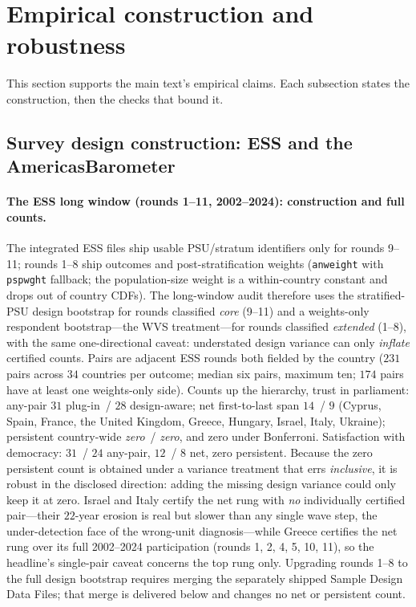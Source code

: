 \documentclass[12pt]{article}
\theoremstyle{definition}
\theoremstyle{remark}
\begin{document}
\section{Empirical construction and robustness}\label{sup:empirical}

This section supports the main text's empirical claims. Each subsection
states the construction, then the checks that bound it.

\subsection{Survey design construction: ESS and the AmericasBarometer}\label{sup:design}

\paragraph{The ESS long window (rounds 1--11, 2002--2024): construction and full
counts.} The integrated ESS files ship usable PSU/stratum identifiers only for
rounds 9--11; rounds 1--8 ship outcomes and post-stratification weights
(\texttt{anweight} with \texttt{pspwght} fallback; the population-size weight is a
within-country constant and drops out of country CDFs). The long-window audit therefore uses the
stratified-PSU design bootstrap for rounds classified \emph{core} (9--11) and a
weights-only respondent bootstrap---the WVS treatment---for rounds classified
\emph{extended} (1--8), with the same one-directional caveat: understated design
variance can only \emph{inflate} certified counts. Pairs are adjacent ESS rounds
both fielded by the country ($231$ pairs across $34$ countries per outcome; median
six pairs, maximum ten; $174$ pairs have at least one weights-only side). Counts up
the hierarchy, trust in parliament: any-pair $31$ plug-in~/ $28$ design-aware; net
first-to-last span $14$~/ $9$ (Cyprus, Spain, France, the United Kingdom, Greece,
Hungary, Israel, Italy, Ukraine); persistent country-wide \emph{zero}~/
\emph{zero}, and zero under Bonferroni. Satisfaction with democracy: $31$~/ $24$
any-pair, $12$~/ $8$ net, zero persistent. Because the zero persistent count is
obtained under a variance treatment that errs \emph{inclusive}, it is robust in
the disclosed direction: adding the missing design variance could only keep it at
zero. Israel and Italy certify the net rung with \emph{no} individually certified
pair---their $22$-year erosion is real but slower than any single wave step, the
under-detection face of the wrong-unit diagnosis---while Greece certifies the net
rung over its full 2002--2024 participation (rounds 1, 2, 4, 5, 10, 11), so the
headline's single-pair caveat concerns the top rung only. Upgrading rounds 1--8 to
the full design bootstrap requires merging the separately shipped Sample Design
Data Files; that merge is delivered
below and changes no net or persistent count.
\end{document}
